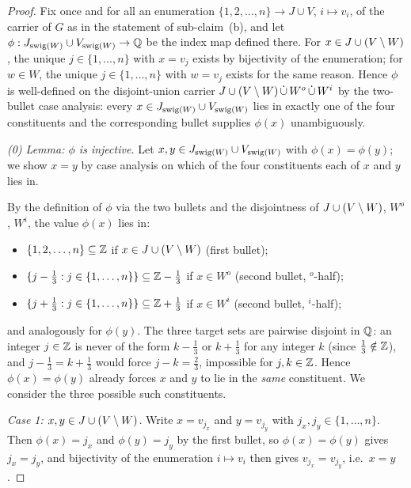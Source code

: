 \documentclass[main]{subfiles}
\begin{document}
\begin{proof}
Fix once and for all an enumeration $\{1, 2, \dots, n\} \to J \cup V$, $i \mapsto v_i$, of the carrier of $G$ as in the statement of sub-claim~(b), and let $\phi : J_{\mathrm{swig}(W)} \cup V_{\mathrm{swig}(W)} \to \mathbb{Q}$ be the index map defined there. For $x \in J \cup (V \setminus W)$, the unique $j \in \{1, \dots, n\}$ with $x = v_j$ exists by bijectivity of the enumeration; for $w \in W$, the unique $j \in \{1, \dots, n\}$ with $w = v_j$ exists for the same reason. Hence $\phi$ is well-defined on the disjoint-union carrier $J \cup (V \setminus W) \,\dot{\cup}\, W^o \,\dot{\cup}\, W^i$ by the two-bullet case analysis: every $x \in J_{\mathrm{swig}(W)} \cup V_{\mathrm{swig}(W)}$ lies in exactly one of the four constituents and the corresponding bullet supplies $\phi(x)$ unambiguously.

\medskip\noindent\emph{(0) Lemma: $\phi$ is injective.}
Let $x, y \in J_{\mathrm{swig}(W)} \cup V_{\mathrm{swig}(W)}$ with $\phi(x) = \phi(y)$; we show $x = y$ by case analysis on which of the four constituents each of $x$ and $y$ lies in.

By the definition of $\phi$ via the two bullets and the disjointness of $J \cup (V \setminus W)$, $W^o$, $W^i$, the value $\phi(x)$ lies in:
\begin{itemize}
    \item $\{1, 2, \dots, n\} \subseteq \mathbb{Z}$ if $x \in J \cup (V \setminus W)$ (first bullet);
    \item $\{j - \tfrac{1}{3} : j \in \{1, \dots, n\}\} \subseteq \mathbb{Z} - \tfrac{1}{3}$ if $x \in W^o$ (second bullet, $^o$-half);
    \item $\{j + \tfrac{1}{3} : j \in \{1, \dots, n\}\} \subseteq \mathbb{Z} + \tfrac{1}{3}$ if $x \in W^i$ (second bullet, $^i$-half);
\end{itemize}
and analogously for $\phi(y)$. The three target sets are pairwise disjoint in $\mathbb{Q}$: an integer $j \in \mathbb{Z}$ is never of the form $k - \tfrac{1}{3}$ or $k + \tfrac{1}{3}$ for any integer $k$ (since $\tfrac{1}{3} \notin \mathbb{Z}$), and $j - \tfrac{1}{3} = k + \tfrac{1}{3}$ would force $j - k = \tfrac{2}{3}$, impossible for $j, k \in \mathbb{Z}$. Hence $\phi(x) = \phi(y)$ already forces $x$ and $y$ to lie in the \emph{same} constituent. We consider the three possible such constituents.

\emph{Case 1: $x, y \in J \cup (V \setminus W)$.} Write $x = v_{j_x}$ and $y = v_{j_y}$ with $j_x, j_y \in \{1, \dots, n\}$. Then $\phi(x) = j_x$ and $\phi(y) = j_y$ by the first bullet, so $\phi(x) = \phi(y)$ gives $j_x = j_y$, and bijectivity of the enumeration $i \mapsto v_i$ then gives $v_{j_x} = v_{j_y}$, i.e.\ $x = y$.


\end{proof}
\end{document}
